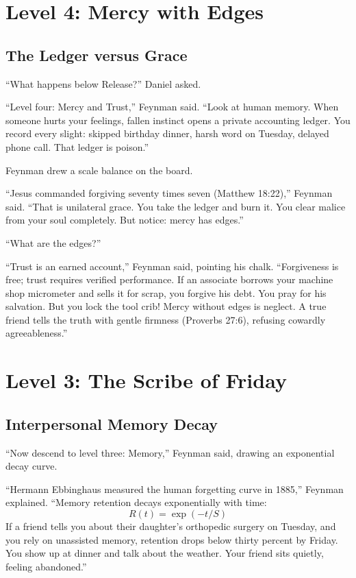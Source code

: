 \documentclass[11pt]{report}
\begin{document}
\chapter{Level 4: Mercy with Edges}

\section{The Ledger versus Grace}
``What happens below Release?'' Daniel asked.

``Level four: Mercy and Trust,'' Feynman said. ``Look at human memory. When someone hurts your feelings, fallen instinct opens a private accounting ledger. You record every slight: skipped birthday dinner, harsh word on Tuesday, delayed phone call. That ledger is poison.''

Feynman drew a scale balance on the board.

``Jesus commanded forgiving seventy times seven (Matthew 18:22),'' Feynman said. ``That is unilateral grace. You take the ledger and burn it. You clear malice from your soul completely. But notice: mercy has edges.''

``What are the edges?''

``Trust is an earned account,'' Feynman said, pointing his chalk. ``Forgiveness is free; trust requires verified performance. If an associate borrows your machine shop micrometer and sells it for scrap, you forgive his debt. You pray for his salvation. But you lock the tool crib! Mercy without edges is neglect. A true friend tells the truth with gentle firmness (Proverbs 27:6), refusing cowardly agreeableness.''

\chapter{Level 3: The Scribe of Friday}

\section{Interpersonal Memory Decay}
``Now descend to level three: Memory,'' Feynman said, drawing an exponential decay curve.

``Hermann Ebbinghaus measured the human forgetting curve in 1885,'' Feynman explained. ``Memory retention decays exponentially with time:
\begin{equation}
R(t) = \exp(-t / S)
\end{equation}
If a friend tells you about their daughter's orthopedic surgery on Tuesday, and you rely on unassisted memory, retention drops below thirty percent by Friday. You show up at dinner and talk about the weather. Your friend sits quietly, feeling abandoned.''
\end{document}
